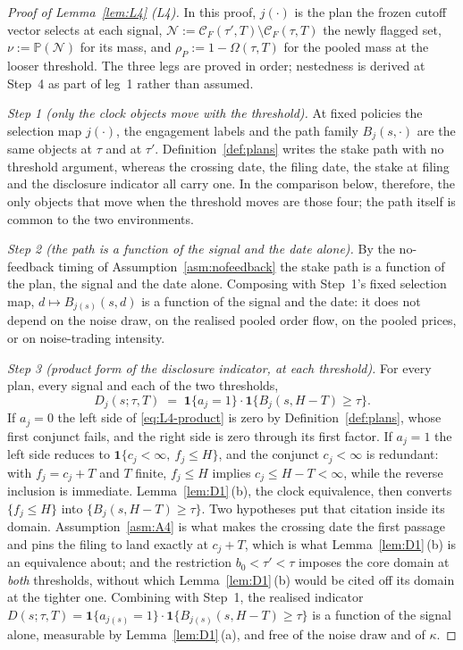 \documentclass[11pt]{article}
\newcommand{\Prb}{\mathbb{P}}
\newcommand{\ind}{\mathbf{1}}
\begin{document}
\begin{proof}[Proof of Lemma~\ref{lem:L4} (L4)]
In this proof, $j(\cdot)$ is the plan the frozen cutoff vector selects at each signal,
$\mathcal N := \mathcal C_F(\tau',T)\setminus\mathcal C_F(\tau,T)$ the newly flagged set,
$\nu := \Prb(\mathcal N)$ for its mass, and $\rho_P := 1-\Omega(\tau,T)$ for the pooled mass at the
looser threshold. The three legs are proved in order; nestedness is derived at Step~4 as part of
leg~1 rather than assumed.

\emph{Step 1 (only the clock objects move with the threshold).} At fixed policies the selection map
$j(\cdot)$, the engagement labels and the path family $B_j(s,\cdot)$ are the same objects at $\tau$
and at $\tau'$. Definition~\ref{def:plans} writes the stake path with no threshold argument, whereas
the crossing date, the filing date, the stake at filing and the disclosure indicator all carry one.
In the comparison below, therefore, the only objects that move when the threshold moves are those
four; the path itself is common to the two environments.

\emph{Step 2 (the path is a function of the signal and the date alone).} By the no-feedback timing of
Assumption~\ref{asm:nofeedback} the stake path is a function of the plan, the signal and the date
alone. Composing with Step~1's fixed selection map, $d \mapsto B_{j(s)}(s,d)$ is a function of the
signal and the date: it does not depend on the noise draw, on the realised pooled order flow, on the
pooled prices, or on noise-trading intensity.

\emph{Step 3 (product form of the disclosure indicator, at each threshold).} For every plan, every
signal and each of the two thresholds,
\begin{equation}
\label{eq:L4-product}
D_j(s;\tau,T) \;=\; \ind\{a_j = 1\}\cdot\ind\{B_j(s,H-T) \ge \tau\}.
\end{equation}
If $a_j = 0$ the left side of \eqref{eq:L4-product} is zero by Definition~\ref{def:plans}, whose
first conjunct fails, and the right side is zero through its first factor. If $a_j = 1$ the left side
reduces to $\ind\{c_j<\infty,\ f_j \le H\}$, and the conjunct $c_j < \infty$ is redundant: with
$f_j = c_j+T$ and $T$ finite, $f_j \le H$ implies $c_j \le H-T < \infty$, while the reverse inclusion
is immediate. Lemma~\ref{lem:D1}\,(b), the clock equivalence, then converts $\{f_j \le H\}$ into
$\{B_j(s,H-T) \ge \tau\}$. Two hypotheses put that citation inside its domain.
Assumption~\ref{asm:A4} is what makes the crossing date the first passage and pins the filing to land
exactly at $c_j+T$, which is what Lemma~\ref{lem:D1}\,(b) is an equivalence about; and the
restriction $b_0 < \tau' < \tau$ imposes the core domain at \emph{both} thresholds, without which
Lemma~\ref{lem:D1}\,(b) would be cited off its domain at the tighter one. Combining with Step~1, the
realised indicator $D(s;\tau,T) = \ind\{a_{j(s)}=1\}\cdot\ind\{B_{j(s)}(s,H-T)\ge\tau\}$ is a
function of the signal alone, measurable by Lemma~\ref{lem:D1}\,(a), and free of the noise draw and
of $\kappa$.


\end{proof}
\end{document}
